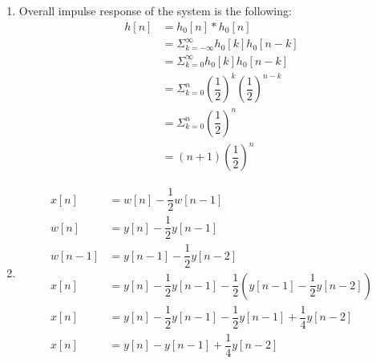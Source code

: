 \documentclass[10pt,a4paper, margin=1in]{article}
\begin{document}
\begin{enumerate}
\begin{enumerate}
    \item %
    Overall impulse response of the system is the following:
    \begin{equation}
        \begin{split}
            h[n] &= h_0[n]*h_0[n]\\
            &=\Sigma^{\infty}_{k=-\infty}h_0[k]h_0[n-k]\\
            &=\Sigma^{\infty}_{k=0}h_0[k]h_0[n-k]\\
            &=\Sigma^{n}_{k=0}\left(\dfrac{1}{2}\right)^k\left(\dfrac{1}{2}\right)^{n-k}\\
            &=\Sigma^{n}_{k=0}\left(\dfrac{1}{2}\right)^n\\
            &=(n+1)\left(\dfrac{1}{2}\right)^n
        \end{split}
    \end{equation}

    \item %
    \begin{equation}
        \begin{split}
            x[n] &= w[n] -\dfrac{1}{2}w[n-1] \\
            w[n] &= y[n] -\dfrac{1}{2}y[n-1] \\
            w[n-1]&=y[n-1]-\dfrac{1}{2}y[n-2]\\
            x[n] &= y[n] -\dfrac{1}{2}y[n-1] -\dfrac{1}{2} \left(y[n-1]-\dfrac{1}{2}y[n-2] \right)\\
            x[n] &= y[n] -\dfrac{1}{2}y[n-1] -\dfrac{1}{2} y[n-1]+\dfrac{1}{4}y[n-2]\\
            x[n] &= y[n] -y[n-1] +\dfrac{1}{4}y[n-2]\\
        \end{split}
    \end{equation}
    \end{enumerate}

\end{enumerate}
\end{document}
